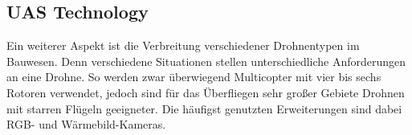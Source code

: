 


\subsection{UAS Technology}


Ein weiterer Aspekt ist die Verbreitung verschiedener Drohnentypen im Bauwesen.
Denn verschiedene Situationen stellen unterschiedliche Anforderungen an eine Drohne.
So werden zwar überwiegend Multicopter mit vier bis sechs Rotoren verwendet, jedoch sind für das Überfliegen sehr großer Gebiete Drohnen mit starren Flügeln geeigneter.
Die häufigst genutzten Erweiterungen sind dabei RGB- und Wärmebild-Kameras.
\cite[S. 90--92]{abaeano2021trends}


